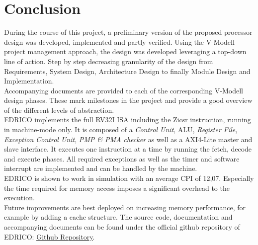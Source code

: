 \chapter{Conclusion}
During the course of this project, a preliminary version of the proposed processor design was developed, implemented and partly verified. Using the V-Modell project management approach, the design was developed leveraging a top-down line of action. Step by step decreasing granularity of the design from Requirements, System Design, Architecture Design to finally Module Design and Implementation. \\
Accompanying documents are provided to each of the corresponding V-Modell design phases. These mark milestones in the project and provide a good overview of the different levels of abstraction.\\
\ac{EDRICO} implements the full \ac{RV32I} \ac{ISA} including the Zicsr instruction, running in machine-mode only. It is composed of a \textit{Control Unit}, \ac{ALU}, \textit{Register File}, \textit{Exception Control Unit}, \textit{PMP \& PMA checker} as well as a \ac{AXI4-Lite} master and slave interface. It executes one instruction at a time by running the fetch, decode and execute phases. All required exceptions as well as the timer and software interrupt are implemented and can be handled by the machine. \\
\ac{EDRICO} is shown to work in simulation with an average \ac{CPI} of 12,07. Especially the time required for memory access imposes a significant overhead to the execution.\\
Future improvements are best deployed on increasing memory performance, for example by adding a cache structure. The source code, documentation and accompanying documents can be found under the official github repository of \ac{EDRICO}: \underline{\href{https://github.com/LeviBohnacker/EDRICO}{Github Repository}}.
